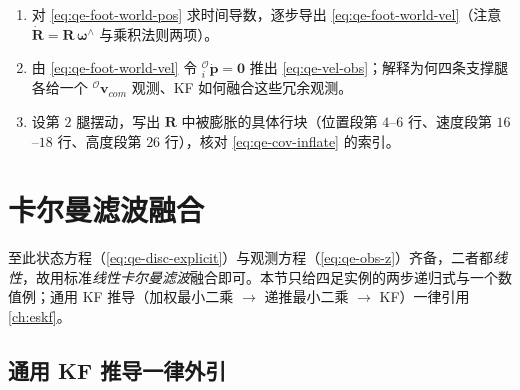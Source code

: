 \begin{practice}
\begin{enumerate}
  \item 对 \cref{eq:qe-foot-world-pos} 求时间导数，逐步导出 \cref{eq:qe-foot-world-vel}（注意 $\dot{\mathbf{R}}=\mathbf{R}\,\boldsymbol\omega^\wedge$ 与乘积法则两项）。
  \item 由 \cref{eq:qe-foot-world-vel} 令 ${}^{\mathcal{O}}_{i}\dot{\boldsymbol p}=\boldsymbol 0$ 推出 \cref{eq:qe-vel-obs}；解释为何四条支撑腿各给一个 ${}^{\mathcal{O}}\boldsymbol v_{com}$ 观测、KF 如何融合这些冗余观测。
  \item 设第 $2$ 腿摆动，写出 $\mathbf{R}$ 中被膨胀的具体行块（位置段第 $4$--$6$ 行、速度段第 $16$--$18$ 行、高度段第 $26$ 行），核对 \cref{eq:qe-cov-inflate} 的索引。
\end{enumerate}
\end{practice}

\section{卡尔曼滤波融合}
\label{sec:qe-kf}

至此状态方程（\cref{eq:qe-disc-explicit}）与观测方程（\cref{eq:qe-obs-z}）齐备，二者都\emph{线性}，故用标准\emph{线性卡尔曼滤波}融合即可。本节只给四足实例的两步递归式与一个数值例；通用 KF 推导（加权最小二乘 $\to$ 递推最小二乘 $\to$ KF）一律引用 \cref{ch:eskf}。

\subsection{通用 KF 推导一律外引}
\label{subsec:qe-kf-cite}

